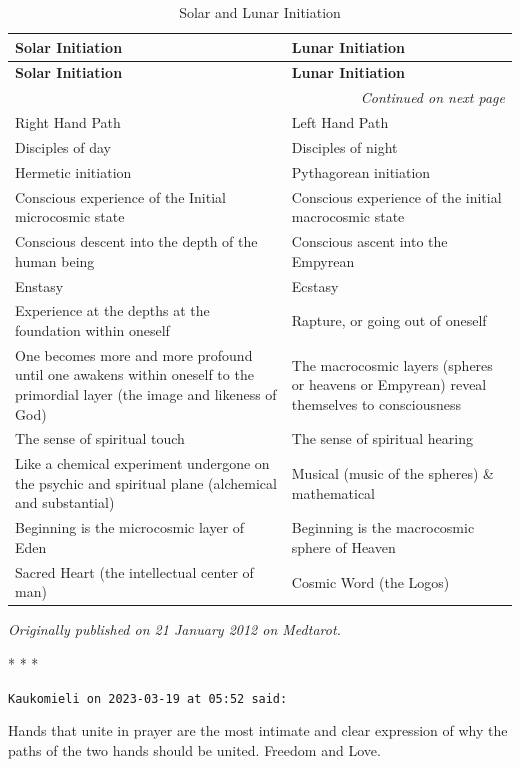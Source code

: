 {\small
\begin{longtable}{p{}p{}}
\caption{Solar and Lunar Initiation}
\label{tab:SolarLunarInitiation}\\

\toprule
\textbf{Solar Initiation} & \textbf{Lunar Initiation} \\
\midrule
\endfirsthead

\toprule
\textbf{Solar Initiation} & \textbf{Lunar Initiation} \\
\midrule
\endhead

\midrule
\multicolumn{2}{r}{\textit{Continued on next page}}\\
\midrule
\endfoot

\bottomrule
\endlastfoot

Right Hand Path & Left Hand Path \\
Disciples of day & Disciples of night \\
Hermetic initiation & Pythagorean initiation \\
Conscious experience of the Initial microcosmic state & Conscious experience of the initial macrocosmic state \\
Conscious descent into the depth of the human being & Conscious ascent into the Empyrean \\
Enstasy & Ecstasy \\
Experience at the depths at the foundation within oneself & Rapture, or going out of oneself \\
One becomes more and more profound until one awakens within oneself to the primordial layer (the image and likeness of God) & The macrocosmic layers (spheres or heavens or Empyrean) reveal themselves to consciousness \\
The sense of spiritual touch & The sense of spiritual hearing \\
Like a chemical experiment undergone on the psychic and spiritual plane (alchemical and substantial) & Musical (music of the spheres) \& mathematical \\
Beginning is the microcosmic layer of Eden & Beginning is the macrocosmic sphere of Heaven \\
Sacred Heart (the intellectual center of man) & Cosmic Word (the Logos) \\

\end{longtable}
}

\textit{Originally published on 21 January 2012 on Medtarot.}



\begin{center}* * *\end{center}

\begin{footnotesize}
\begin{sffamily}
\texttt{Kaukomieli on 2023-03-19 at 05:52 said:}

Hands that unite in prayer are the most intimate and clear expression of why the paths of the two hands should be united. Freedom and Love.

\end{sffamily}
\end{footnotesize}

